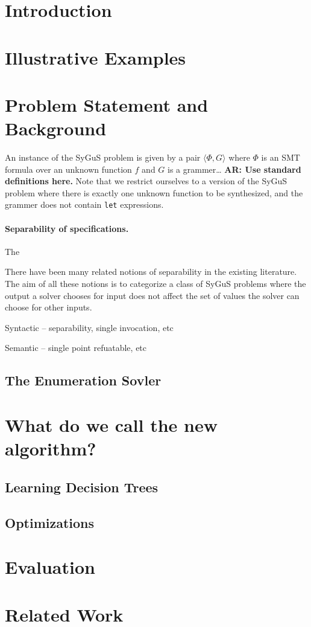 \documentclass{llncs}
\newcommand\arsays[1]{{\bf AR: #1}}
\newcommand\tuple[1]{\langle #1 \rangle}
\begin{document}
\section{Introduction}
\label{sec:intro}

\section{Illustrative Examples}
\label{sec:example}

\section{Problem Statement and Background}
\label{sec:problem}

An instance of the SyGuS problem is given by a pair $\tuple { \Phi, G }$
where $\Phi$ is an SMT formula over an unknown function $f$ and $G$ is a
grammer\dots 
\arsays{Use standard definitions here.}
Note that we restrict ourselves to a version of the SyGuS problem where
there is exactly one unknown function to be synthesized, and the grammer
does not contain {\tt let} expressions.


\paragraph{Separability of specifications.}
The 

\begin{remark}
  There have been many related notions of separability in the existing
  literature.
  The aim of all these notions is to categorize a class of SyGuS
  problems where the output a solver chooses for input does not affect
  the set of values the solver can choose for other inputs.

  Syntactic -- separability, single invocation, etc

  Semantic -- single point refuatable, etc
\end{remark}

\subsection{The Enumeration Sovler}
\label{sec:enumeration}

\section{What do we call the new algorithm?}
\label{sec:algo}

\subsection{Learning Decision Trees}
\label{sec:decision_trees}

\subsection{Optimizations}
\label{sec:optimizations}

\section{Evaluation}
\label{sec:evaluation}

\section{Related Work}
\label{sec:related_work}

\
\end{document}
